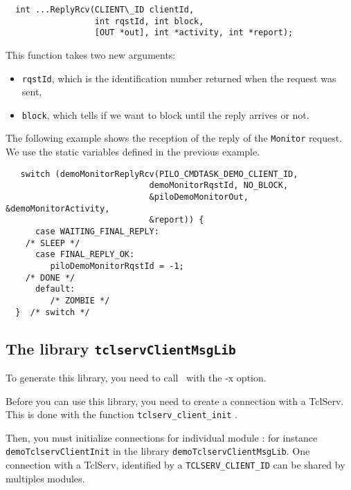 \begin{center}\begin{cartouche}\small\begin{verbatim}
  int ...ReplyRcv(CLIENT\_ID clientId,
                  int rqstId, int block,
                  [OUT *out], int *activity, int *report);
\end{verbatim}\end{cartouche}\end{center}

This function takes two new arguments:
\begin{itemize}
\item \texttt{rqstId}, which is the identification number returned when the
request was sent,

\item \texttt{block}, which tells if we want to block until the
reply arrives or not.
\end{itemize}

The  following  example shows the  reception   of the  reply of  the 
\texttt{Monitor}  request.  We   use the static
variables defined in the previous example.


\begin{center}\begin{cartouche}\small\begin{verbatim}
   switch (demoMonitorReplyRcv(PILO_CMDTASK_DEMO_CLIENT_ID, 
                             demoMonitorRqstId, NO_BLOCK,
                             &piloDemoMonitorOut, &demoMonitorActivity, 
                             &report)) {
      case WAITING_FINAL_REPLY:
	/* SLEEP */
      case FINAL_REPLY_OK:
         piloDemoMonitorRqstId = -1;
	/* DONE */
      default:
         /* ZOMBIE */
  }  /* switch */
\end{verbatim}\end{cartouche}\end{center}


\subsection{The library \texttt{tclservClientMsgLib}}
\label{sec|tclserv_client_lib}

To generate this library, you need to call \GenoM\ with the -x option.

Before you can use this library, you need to create a connection with a
TclServ.  This is  done with the  function \texttt{tclserv\_client\_init} .

Then, you  must  initialize   connections  for individual   module : for
instance \texttt{demoTclservClientInit} in the library
\texttt{demoTclservClientMsgLib}. One connection with a TclServ, identified by
a \texttt{TCLSERV\_CLIENT\_ID} can be shared by multiples modules.

